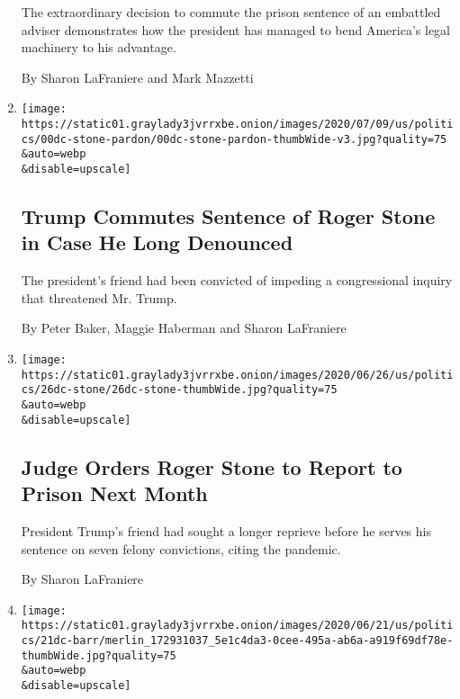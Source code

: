 \begin{enumerate}
  The extraordinary decision to commute the prison sentence of an
  embattled adviser demonstrates how the president has managed to bend
  America's legal machinery to his advantage.

  By Sharon LaFraniere and Mark Mazzetti
\item
  \href{/2020/07/10/us/politics/trump-roger-stone-clemency.html}{}

  \texttt{[image: https://static01.graylady3jvrrxbe.onion/images/2020/07/09/us/politics/00dc-stone-pardon/00dc-stone-pardon-thumbWide-v3.jpg?quality=75\\\&auto=webp\\\&disable=upscale]}

  \hypertarget{trump-commutes-sentence-of-roger-stone-in-case-he-long-denounced}{%
  \subsection{Trump Commutes Sentence of Roger Stone in Case He Long
  Denounced}\label{trump-commutes-sentence-of-roger-stone-in-case-he-long-denounced}}

  The president's friend had been convicted of impeding a congressional
  inquiry that threatened Mr. Trump.

  By Peter Baker, Maggie Haberman and Sharon LaFraniere
\item
  \href{/2020/06/26/us/politics/roger-stone-prison.html}{}

  \texttt{[image: https://static01.graylady3jvrrxbe.onion/images/2020/06/26/us/politics/26dc-stone/26dc-stone-thumbWide.jpg?quality=75\\\&auto=webp\\\&disable=upscale]}

  \hypertarget{judge-orders-roger-stone-to-report-to-prison-next-month}{%
  \subsection{Judge Orders Roger Stone to Report to Prison Next
  Month}\label{judge-orders-roger-stone-to-report-to-prison-next-month}}

  President Trump's friend had sought a longer reprieve before he serves
  his sentence on seven felony convictions, citing the pandemic.

  By Sharon LaFraniere
\item
  \href{/2020/06/21/us/politics/barr-berman.html}{}

  \texttt{[image: https://static01.graylady3jvrrxbe.onion/images/2020/06/21/us/politics/21dc-barr/merlin\_172931037\_5e1c4da3-0cee-495a-ab6a-a919f69df78e-thumbWide.jpg?quality=75\\\&auto=webp\\\&disable=upscale]}


\end{enumerate}
